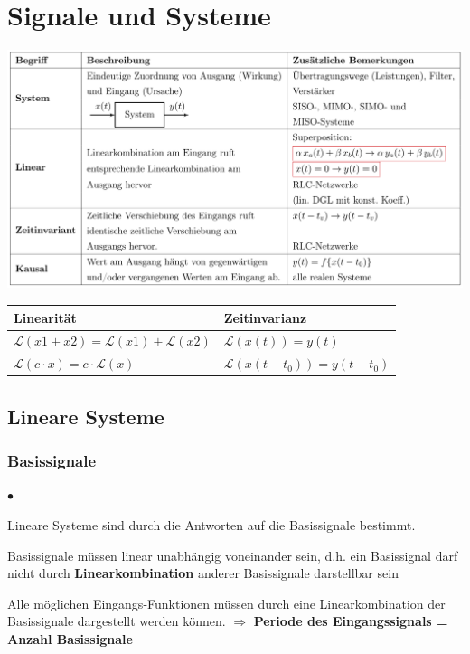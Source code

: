 \section{Signale und Systeme}
	
	\includegraphics[width=\textwidth]{./bilder/LTISystem.png}\\

	\begin{tabular}{|l|l|}
    	\hline
    	\textbf{Linearität} & \textbf{Zeitinvarianz}\\
    	\hline
    	$\mathcal{L}(x1+x2)=\mathcal{L}(x1)+\mathcal{L}(x2)$ & $\mathcal{L}(x(t)) = y(t)$ \\
    	$\mathcal{L}(c\cdot x)=c\cdot \mathcal{L}(x)$ & $\mathcal{L}(x(t-t_0)) = y(t-t_0)$ \\
		\hline    
    \end{tabular}
  			
		
	\subsection{Lineare Systeme}
		\subsubsection{Basissignale}
			\begin{list}{$\bullet$}{\setlength{\itemsep}{0cm} \setlength{\parsep}{0cm} \setlength{\topsep}{0cm}} 
	          \item Lineare Systeme sind durch die Antworten auf die
	          Basissignale bestimmt.
	          \item Basissignale müssen linear unabhängig voneinander sein, d.h. ein
			Basissignal darf nicht durch \textbf{Linearkombination} anderer Basissignale
			darstellbar sein          
			  \item Alle möglichen Eingangs-Funktionen müssen durch eine Linearkombination der
			Basissignale dargestellt werden können. $\Rightarrow$ \textbf{Periode des Eingangssignals =	Anzahl Basissignale}
	        \end{list}
	        \vspace{.2cm}
        
